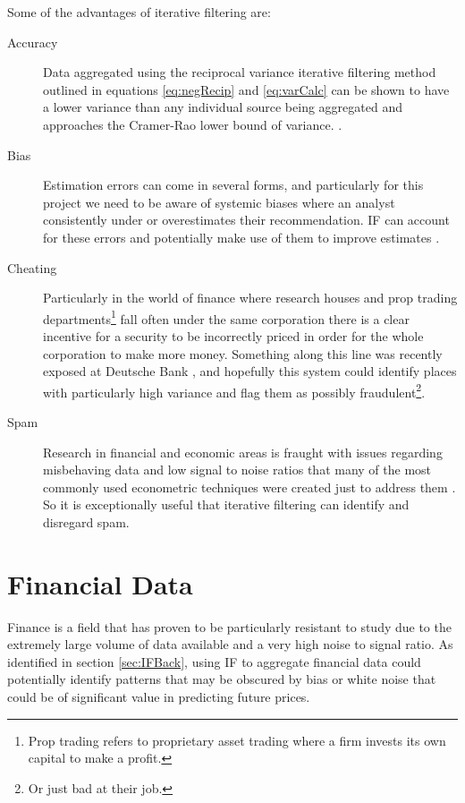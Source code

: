 Some of the advantages of iterative filtering are:
\begin{description}
    \item[Accuracy] Data aggregated using the reciprocal variance iterative filtering method outlined in equations \ref{eq:negRecip} and \ref{eq:varCalc} can be shown to have a lower variance than any individual source being aggregated and approaches the Cramer-Rao lower bound of variance. \cite{ifNotes4121}.
    \item[Bias] Estimation errors can come in several forms, and particularly for this project we need to be aware of systemic biases where an analyst consistently under or overestimates their recommendation. IF can account for these errors and potentially make use of them to improve estimates \cite{ignjatovic2009computing}.
    \item[Cheating] Particularly in the world of finance where research houses and prop trading departments\footnote{Prop trading refers to proprietary asset trading where a firm invests its own capital to make a profit.} fall often under the same corporation there is a clear incentive for a security to be incorrectly priced in order for the whole corporation to make more money. Something along this line was recently exposed at Deutsche Bank \cite{sillyDeutsche}, and hopefully this system could identify places with particularly high variance and flag them as possibly fraudulent\footnote{Or just bad at their job.}.
    \item[Spam] Research in financial and economic areas is fraught with issues regarding misbehaving data and low signal to noise ratios that many of the most commonly used econometric techniques were created just to address them \cite{juselius2014testing}. So it is exceptionally useful that iterative filtering can identify and disregard spam.
\end{description}

\section{Financial Data}
Finance is a field that has proven to be particularly resistant to study due to the extremely large volume of data available and a very high noise to signal ratio\cite{juselius2014testing}. As identified in section \ref{sec:IFBack}, using IF to aggregate financial data could potentially identify patterns that may be obscured by bias or white noise that could be of significant value in predicting future prices.

